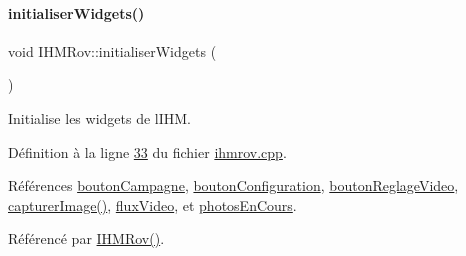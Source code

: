 \paragraph{\texorpdfstring{initialiser\+Widgets()}{initialiserWidgets()}}
{\footnotesize\ttfamily void I\+H\+M\+Rov\+::initialiser\+Widgets (\begin{DoxyParamCaption}{ }\end{DoxyParamCaption})\hspace{0.3cm}{\ttfamily [private]}}



Initialise les widgets de l\textquotesingle{}I\+HM. 



Définition à la ligne \hyperlink{ihmrov_8cpp_source_l00033}{33} du fichier \hyperlink{ihmrov_8cpp_source}{ihmrov.\+cpp}.



Références \hyperlink{ihmrov_8h_source_l00057}{bouton\+Campagne}, \hyperlink{ihmrov_8h_source_l00058}{bouton\+Configuration}, \hyperlink{ihmrov_8h_source_l00052}{bouton\+Reglage\+Video}, \hyperlink{ihmrov_8cpp_source_l00179}{capturer\+Image()}, \hyperlink{ihmrov_8h_source_l00050}{flux\+Video}, et \hyperlink{ihmrov_8h_source_l00051}{photos\+En\+Cours}.



Référencé par \hyperlink{ihmrov_8cpp_source_l00015}{I\+H\+M\+Rov()}.


